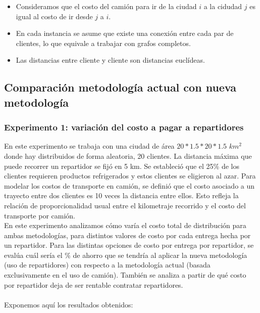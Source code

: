 \documentclass{article}
\begin{document}
    \begin{itemize}
        \item Consideramos que el costo del camión para ir de la ciudad $i$ a la cidudad $j$ es igual al costo de ir desde $j$ a $i$.
        \item En cada instancia se asume que existe una conexión entre cada par de clientes, lo que equivale a trabajar con grafos completos.
        \item Las distancias entre cliente y cliente son distancias euclídeas.
    \end{itemize}
    
    
    \subsection{Comparación metodología actual con nueva metodología} 
    
    \subsubsection{Experimento 1: variación del costo a pagar a repartidores}
    
    En este experimento se trabaja con una ciudad de área $20 * 1.5 * 20 * 1.5$  $km^{2}$ donde hay distribuidos de forma aleatoria, 20 clientes. La distancia máxima que puede recorrer un repartidor se fijó en 5 km. 
    Se estableció que el 25\% de los clientes requieren productos refrigerados y estos clientes se eligieron al azar. 
    Para modelar los costos de transporte en camión, se definió que el costo asociado a un trayecto entre dos clientes es 10 veces la distancia entre ellos. Esto refleja la relación de proporcionalidad usual entre el kilometraje recorrido y el costo del transporte por camión. \\
    En este experimento analizamos cómo varía el costo total de distribución para ambas metodologías, para distintos valores de costo por cada entrega hecha por un repartidor. Para las distintas opciones de costo por entrega por repartidor, se evalúa cuál sería el \% de ahorro que se tendría al aplicar la nueva metodología (uso de repartidores) con respecto a la metodología actual (basada exclusivamente en el uso de camión). También se analiza a partir de qué costo por repartidor deja de ser rentable contratar repartidores. \\
    \\
    Exponemos aquí los resultados obtenidos: 
    
\end{document}
